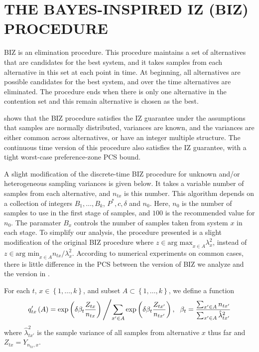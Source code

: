 \documentclass{wscpaperproc}
\theoremstyle{wsc}
\begin{document}
\section{THE BAYES-INSPIRED IZ (BIZ) PROCEDURE}
\label{sec:BIZ}

BIZ is an elimination procedure. This procedure maintains a set of
alternatives that are candidates for the best system, and it takes samples from each
alternative in this set at each point in time. At beginning, all alternatives
are possible candidates for the best system, and over the time alternatives are eliminated.
The procedure ends when there is only one alternative in the contention
set and this remain alternative is chosen as the best. 

 shows that the BIZ procedure satisfies the IZ guarantee 
under the assumptions that samples are normally distributed, variances are known, and
the variances are either common across alternatives, or have an integer multiple structure.
The continuous time version of this procedure also satisfies the IZ guarantee, with a tight worst-case
preference-zone PCS bound.

A slight modification of the discrete-time BIZ procedure for unknown and/or heterogeneous sampling
variances is given below.  It takes a variable number of samples
from each alternative, and $n_{tx}$ is this number. This algorithm
depends on a collection of integers $B_{1},\ldots,B_{k}$, $P^{*},c,\delta$
and $n_{0}$. Here, $n_{0}$ is the number of samples to use in the first
stage of samples, and $100$ is the recommended value for $n_{0}$. The paramater
$B_{x}$ controls the number of samples taken from system $x$ in
each stage. To simplify our analysis, the procedure presented is a slight modification of the original BIZ 
procedure \cite{Frazier:BIZ} where $z \in \mbox{arg max}_{x\in A} \lambda^2_{x}$, instead 
of $z \in \mbox{arg min}_{x\in A} n_{tx} / \lambda^2_{x}$. According to numerical experiments on common cases, there is little difference in the PCS between the version of BIZ
we analyze and the version in .

For each $t$, $x\in\left\{ 1,\ldots,k\right\} $, and subset $A\subset\left\{ 1,\ldots,k\right\} $,
we define a function
\[
q'_{tx}\left(A\right)=\mbox{exp}\left(\delta\beta_{t}\frac{Z_{tx}}{n_{tx}}\right)\left/\sum_{x'\in A}\mbox{exp}\left(\delta\beta_{t}\frac{Z_{tx'}}{n_{tx'}}\right),\right.\mbox{ }\beta_{t}=\frac{\sum_{x'\in A}n_{tx'}}{\sum_{x'\in A}\hat{\lambda}_{tx'}^{2}}
\]
where $\hat{\lambda}_{tx'}^{2}$ is the sample variance of all samples
from alternative $x$ thus far and $Z_{tx}=Y_{n_{tx},x}$.
\end{document}
